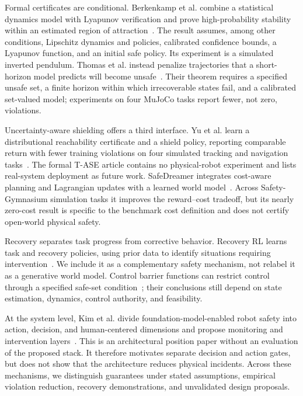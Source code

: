 Formal certificates are conditional. Berkenkamp et al. combine a statistical dynamics model with Lyapunov verification and prove high-probability stability within an estimated region of attraction~\cite{berkenkamp2017safe}. The result assumes, among other conditions, Lipschitz dynamics and policies, calibrated confidence bounds, a Lyapunov function, and an initial safe policy. Its experiment is a simulated inverted pendulum. Thomas et al. instead penalize trajectories that a short-horizon model predicts will become unsafe~\cite{thomas2021imagining}. Their theorem requires a specified unsafe set, a finite horizon within which irrecoverable states fail, and a calibrated set-valued model; experiments on four MuJoCo tasks report fewer, not zero, violations.

Uncertainty-aware shielding offers a third interface. Yu et al. learn a distributional reachability certificate and a shield policy, reporting comparable return with fewer training violations on four simulated tracking and navigation tasks~\cite{yu2022drc}. The formal T-ASE article contains no physical-robot experiment and lists real-system deployment as future work. SafeDreamer integrates cost-aware planning and Lagrangian updates with a learned world model~\cite{huang2024safedreamer}. Across Safety-Gymnasium simulation tasks it improves the reward--cost tradeoff, but its nearly zero-cost result is specific to the benchmark cost definition and does not certify open-world physical safety.

Recovery separates task progress from corrective behavior. Recovery RL learns task and recovery policies, using prior data to identify situations requiring intervention~\cite{thananjeyan2021recovery}. We include it as a complementary safety mechanism, not relabel it as a generative world model. Control barrier functions can restrict control through a specified safe-set condition~\cite{ames2019cbf}; their conclusions still depend on state estimation, dynamics, control authority, and feasibility.

At the system level, Kim et al. divide foundation-model-enabled robot safety into action, decision, and human-centered dimensions and propose monitoring and intervention layers~\cite{kim2026guardrails}. This is an architectural position paper without an evaluation of the proposed stack. It therefore motivates separate decision and action gates, but does not show that the architecture reduces physical incidents. Across these mechanisms, we distinguish guarantees under stated assumptions, empirical violation reduction, recovery demonstrations, and unvalidated design proposals.

